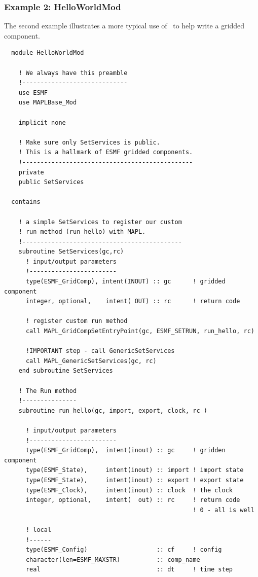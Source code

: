 \subsubsection{Example 2: HelloWorldMod}
\label{sec:ex2}

The second example illustrates a more typical use of \ggn\
to help write a gridded component.

\footnotesize
\begin{verbatim}
  module HelloWorldMod

    ! We always have this preamble
    !-----------------------------
    use ESMF
    use MAPLBase_Mod

    implicit none

    ! Make sure only SetServices is public.
    ! This is a hallmark of ESMF gridded components.
    !-----------------------------------------------
    private
    public SetServices

  contains

    ! a simple SetServices to register our custom
    ! run method (run_hello) with MAPL. 
    !--------------------------------------------
    subroutine SetServices(gc,rc)
      ! input/output parameters
      !------------------------
      type(ESMF_GridComp), intent(INOUT) :: gc      ! gridded component
      integer, optional,    intent( OUT) :: rc      ! return code

      ! register custom run method
      call MAPL_GridCompSetEntryPoint(gc, ESMF_SETRUN, run_hello, rc)
      
      !IMPORTANT step - call GenericSetServices
      call MAPL_GenericSetServices(gc, rc) 
    end subroutine SetServices

    ! The Run method
    !---------------
    subroutine run_hello(gc, import, export, clock, rc )
     
      ! input/output parameters
      !------------------------
      type(ESMF_GridComp),  intent(inout) :: gc     ! gridden component 
      type(ESMF_State),     intent(inout) :: import ! import state
      type(ESMF_State),     intent(inout) :: export ! export state
      type(ESMF_Clock),     intent(inout) :: clock  ! the clock
      integer, optional,    intent(  out) :: rc     ! return code
                                                    ! 0 - all is well

      ! local
      !------
      type(ESMF_Config)                   :: cf     ! config
      character(len=ESMF_MAXSTR)          :: comp_name
      real                                :: dt     ! time step


\end{verbatim}
